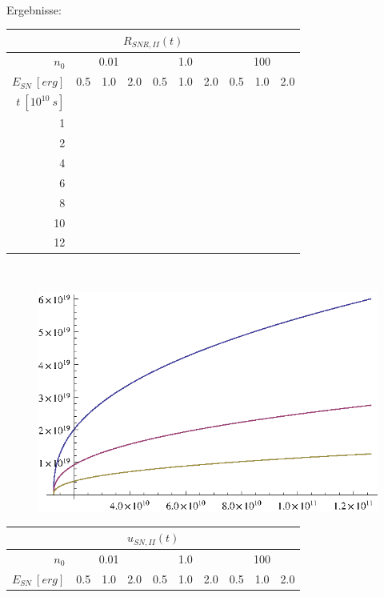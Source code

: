 \\
Ergebnisse:
\begin{center}
\begin{tabular}{|r|l|l|l|l|l|l|l|l|l|}
\multicolumn{10}{c}{\(R_{SNR,II}(t)\)}\\
\hline
\(n_0\) & \multicolumn{3}{|c|}{0.01} & \multicolumn{3}{|c|}{1.0} & \multicolumn{3}{|c|}{100}\\
\hline
\(E_{SN}~[erg]\) & 0.5 & 1.0 & 2.0 & 0.5 & 1.0 & 2.0 & 0.5 & 1.0 & 2.0\\
\hline
\(t~[10^{10}~s]\) & & & & & & & & & \\
\cline{1-1}
1 & & & & & & & & & \\
2 & & & & & & & & & \\
4 & & & & & & & & & \\
6 & & & & & & & & & \\
8 & & & & & & & & & \\
10 & & & & & & & & & \\
12 & & & & & & & & & \\
\hline
\end{tabular}\\
\begin{figure}[ht]
\begin{center}
\includegraphics{aufgabe6r.eps}
\end{center}
\end{figure}
\begin{tabular}{|r|l|l|l|l|l|l|l|l|l|}
\multicolumn{10}{c}{\(u_{SN,II}(t)\)}\\
\hline
\(n_0\) & \multicolumn{3}{|c|}{0.01} & \multicolumn{3}{|c|}{1.0} & \multicolumn{3}{|c|}{100}\\
\hline
\(E_{SN}~[erg]\) & 0.5 & 1.0 & 2.0 & 0.5 & 1.0 & 2.0 & 0.5 & 1.0 & 2.0\\

\end{tabular}
\end{center}
